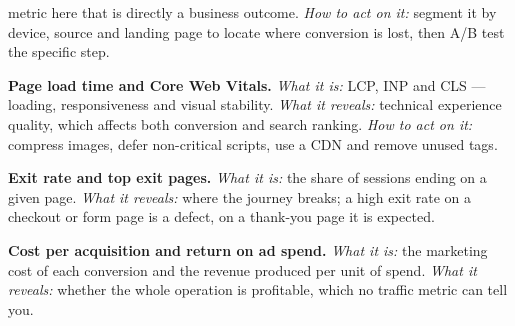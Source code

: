 \begin{qlist}
\begin{apts}
      metric here that is directly a business outcome. \emph{How to act on it:}
      segment it by device, source and landing page to locate where conversion
      is lost, then A/B test the specific step.
\item \textbf{Page load time and Core Web Vitals.} \emph{What it is:} LCP, INP
      and CLS --- loading, responsiveness and visual stability. \emph{What it
      reveals:} technical experience quality, which affects both conversion and
      search ranking. \emph{How to act on it:} compress images, defer
      non-critical scripts, use a CDN and remove unused tags.
\item \textbf{Exit rate and top exit pages.} \emph{What it is:} the share of
      sessions ending on a given page. \emph{What it reveals:} where the
      journey breaks; a high exit rate on a checkout or form page is a defect,
      on a thank-you page it is expected.
\item \textbf{Cost per acquisition and return on ad spend.} \emph{What it is:}
      the marketing cost of each conversion and the revenue produced per unit
      of spend. \emph{What it reveals:} whether the whole operation is
      profitable, which no traffic metric can tell you.
\end{apts}


\end{qlist}
